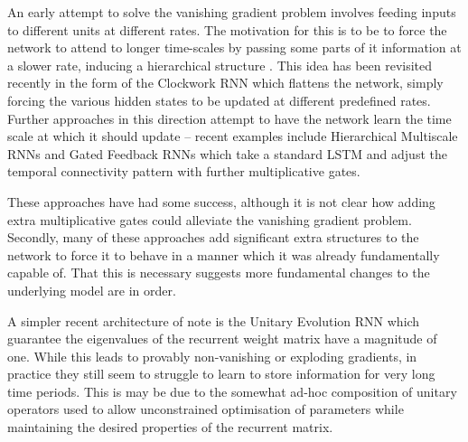 An early attempt to solve the vanishing gradient problem involves feeding inputs to different units
at different
rates. The motivation for this is to be to force the network to attend to longer
time-scales by passing some parts of it information at a slower rate, inducing a hierarchical structure
 \autocite{Hihi1995}. 
This idea has been revisited recently in
the form of the Clockwork RNN \autocite{Koutnik2014} which flattens the network, simply forcing
the various hidden states to be updated at different predefined rates. Further approaches in this
direction attempt to have the network learn the time scale at which it should update -- recent
examples include Hierarchical Multiscale RNNs \autocite{Chung2016} and Gated Feedback RNNs
\autocite{Chung2015} which take a standard LSTM and adjust the temporal connectivity pattern
with further multiplicative gates.

These approaches have had some success, although it is not clear how adding extra
multiplicative gates could alleviate the vanishing gradient problem. Secondly, many of these
approaches add significant extra structures to the network
to force it to behave in a manner which
it was already fundamentally capable of. 
That this is necessary suggests more fundamental changes to the underlying model are in order.

%

A simpler recent architecture of note is the Unitary Evolution RNN
\autocite{Arjovsky2015} which guarantee the eigenvalues of the recurrent weight matrix have a
magnitude of one. While this leads to provably non-vanishing or exploding gradients, in
practice they still seem to struggle to learn to store information for very long time periods.
This is may be due to the somewhat ad-hoc composition of unitary operators used to allow
unconstrained optimisation of parameters while maintaining the desired properties of the
recurrent matrix.

